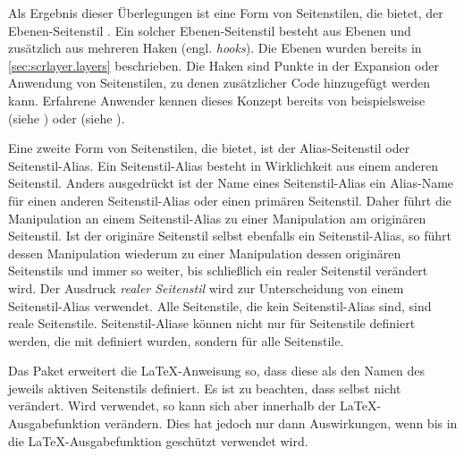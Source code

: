 Als Ergebnis dieser Überlegungen ist eine Form von Seitenstilen, die
 bietet, der Ebenen-Seitenstil%
. Ein
solcher Ebenen-Seitenstil besteht aus Ebenen und zusätzlich aus mehreren Haken
(engl. \emph{hooks}). Die Ebenen wurden bereits in
\autoref{sec:scrlayer.layers} beschrieben. Die
Haken sind Punkte in der Expansion
oder Anwendung von Seitenstilen, zu denen zusätzlicher Code hinzugefügt werden
kann. Erfahrene Anwender kennen dieses Konzept bereits von beispielsweise
 (siehe \cite{latex:usrguide}) oder
 (siehe
).

Eine zweite Form von Seitenstilen, die  bietet, ist der
Alias-Seitenstil%
 oder
Seitenstil-Alias. Ein Seitenstil-Alias besteht in Wirklichkeit aus einem
anderen Seitenstil. Anders ausgedrückt ist der Name eines Seitenstil-Alias ein
Alias-Name für einen anderen Seitenstil-Alias oder einen primären
Seitenstil. Daher führt die Manipulation an einem Seitenstil-Alias zu einer
Manipulation am originären Seitenstil. Ist der originäre Seitenstil selbst
ebenfalls ein Seitenstil-Alias, so führt dessen Manipulation wiederum zu einer
Manipulation dessen originären Seitenstils und immer so weiter, bis
schließlich ein realer Seitenstil verändert wird. Der Ausdruck \emph{realer
  Seitenstil} wird zur Unterscheidung von einem
Seitenstil-Alias verwendet. Alle Seitenstile, die kein Seitenstil-Alias sind,
sind reale Seitenstile. Seitenstil-Aliase können nicht nur für Seitenstile
definiert werden, die mit  definiert wurden, sondern für
alle Seitenstile.


\begin{Declaration}
\end{Declaration}
Das Paket  erweitert die \LaTeX-Anweisung
 so, dass diese
 als den Namen des jeweils aktiven Seitenstils
definiert. Es ist zu beachten, dass
 selbst
 nicht verändert. Wird
 verwendet, so kann sich
 aber innerhalb der \LaTeX-Ausgabefunktion
verändern. Dies hat jedoch nur dann Auswirkungen, wenn
 bis in die \LaTeX-Ausgabefunktion geschützt verwendet
wird.


